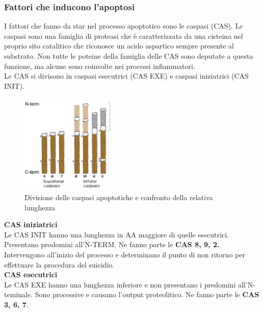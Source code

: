         \subsubsection{Fattori che inducono l'apoptosi}
            I fattori che fanno da star nel processo apoptotico sono le caspasi (CAS). Le caspasi sono una famiglia di proteasi che è caratterizzata da una cisteina nel proprio sito catalitico che riconosce un acido aspartico sempre presente al substrato.
            Non tutte le poteine della famiglia delle CAS sono deputate a questa funzione, ma alcune sono coinvolte nei processi infiammatori.\\
            Le CAS si divisono in caspasi esecutrici (CAS EXE) e caspasi iniziatrici (CAS INIT).\\
            \begin{figure}[h]
                \centering
                \includegraphics[width=0.4\textwidth]{images/caspasi.JPG}
                \caption{\small Divisione delle caspasi apoptotiche e confronto della relativa lunghezza}            
                \label{fig:mesh1}
            \end{figure} 
            
            \textbf{CAS iniziatrici}\\
                Le CAS INIT hanno una lunghezza in AA maggiore di quelle esecutrici. Presentano prodomini all'N-TERM. Ne fanno parte le \textbf{CAS 8, 9, 2.}\\
                Intervengono all'inizio del processo e determinano il punto di non ritorno per effettuare la procedura del suicidio.\\
            
            \textbf{CAS esecutrici}\\
                Le CAS EXE hanno una lunghezza inferiore e non presentano i predomini all'N-teminale. Sono processive e causano l'output proteolitico. Ne fanno parte le \textbf{CAS 3, 6, 7}.\\
                
